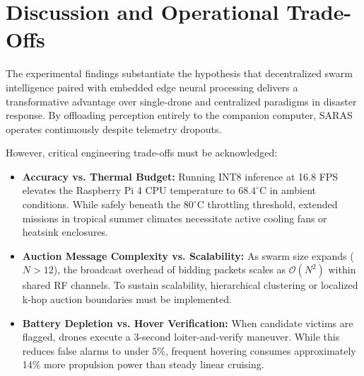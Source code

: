 \section{Discussion and Operational Trade-Offs}

The experimental findings substantiate the hypothesis that decentralized swarm intelligence paired with embedded edge neural processing delivers a transformative advantage over single-drone and centralized paradigms in disaster response. By offloading perception entirely to the companion computer, SARAS operates continuously despite telemetry dropouts. 

However, critical engineering trade-offs must be acknowledged:
\begin{itemize}
    \item \textbf{Accuracy vs. Thermal Budget:} Running INT8 inference at 16.8 FPS elevates the Raspberry Pi 4 CPU temperature to $68.4^\circ\text{C}$ in ambient conditions. While safely beneath the $80^\circ\text{C}$ throttling threshold, extended missions in tropical summer climates necessitate active cooling fans or heatsink enclosures.
    \item \textbf{Auction Message Complexity vs. Scalability:} As swarm size expands ($N > 12$), the broadcast overhead of bidding packets scales as $\mathcal{O}(N^2)$ within shared RF channels. To sustain scalability, hierarchical clustering or localized k-hop auction boundaries must be implemented.
    \item \textbf{Battery Depletion vs. Hover Verification:} When candidate victims are flagged, drones execute a 3-second loiter-and-verify maneuver. While this reduces false alarms to under 5\%, frequent hovering consumes approximately 14\% more propulsion power than steady linear cruising.
\end{itemize}
